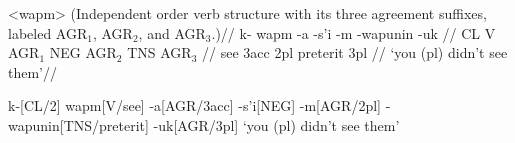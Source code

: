 \ex[belowpreambleskip=0pt,aboveglftskip=0pt,aboveglbskip=0pt,
   aboveglcskip=0pt,everygla=,everyglb=,everyglc=,
   everyglft=]<wapm>
\begingl
\glpreamble (Independent order verb structure with its three
agreement suffixes, labeled {\sc AGR$_1$}, {\sc AGR$_2$}, and {\sc
AGR$_3$}.)//
\gla k- wapm -a -s'i -m -wapunin -uk //
\glb CL V AGR$_1$ NEG AGR$_2$ TNS AGR$_3$ //
 see {\sc 3acc} {} {\sc 2pl} preterit {\sc 3pl} //
\glft `you (pl) didn't see them'//
\endgl
\xe


\ex[glstyle=nlevel]
\begingl
k-[CL/2] wapm[V/see] -a[AGR/\sc 3acc] -s'i[NEG]
-m[AGR/\sc 2pl] -wapunin[TNS/preterit] -uk[AGR/\sc 3pl]
\glft `you (pl) didn't see them'
\endgl
\xe

\endinput

\ex[glstyle=nlevel,belowpreambleskip=0pt,aboveglftskip=0pt,
   aboveglbskip=0pt,   aboveglcskip=0pt,everygla=,everyglb=,
   everyglc=,everyglft=]<gln-wapm>
\begingl
\glpreamble
(Independent order verb structure with its three
agreement suffixes, labeled {\sc AGR$_1$}, {\sc AGR$_2$}, and {\sc
AGR$_3$}.)
\glilg
k-[CL/2] wapm[V/see] -a[AGR/\sc 3acc] -s'i[NEG]
-m[AGR/\sc 2pl] -wapunin[TNS/preterit] -uk[AGR/\sc 3pl]
\glft
`you (pl) didn't see them'
\endgl
\xe

\endinput


\makeatletter
\let\mergerow=\glw@mergerow
\resetatcatcode

\ex[everygla=]
\begingl
\gla a1 {\hfil b1} //
\glb a2 bbbb2 //
\showtoks\mainlist
\endgl\xe



\endinput





\newcount\@itemtype
\def\@getitemtype #1{\expandafter\@getitemtype@i #1\@nil}
\def\@getitemtype@i #1#2\@nil{%
   \def\temp{#2}%
   \ifx\temp\empty
      \if\ep@samecharcode#1+\relax
         \@itemtype=1
      \else\if\ep@samecharcode#1@\relax
         \@itemtype=2
      \else\if\ep@samecharcode #1[\relax
         \@itemtype=3
      \else\if\ep@samecharcode #1]
         \@itemtype=4
      \else \@itemtype=0
         \fi\fi\fi\fi
   \else
      \ifx#1\nogloss \@itemtype=5
      \else \@itemtype=0 \fi
   \fi
}

\lingset{glhangindent=0pt,glstyle=wrap,glrightskip=0pt plus 1in,
   extraglskip=1ex,everygla=}


\ex\begingl
\gla a1 b1 @ r r//
\glb a2 b2 e e e//
\endgl\xe

